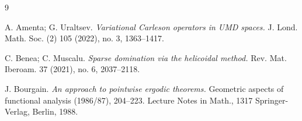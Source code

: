 \documentclass[12pt]{amsart}
\numberwithin{equation}{section}
\theoremstyle{definition}
\begin{document}
\begin{thebibliography}{9}

A. Amenta; G. Uraltsev.
\emph{Variational Carleson operators in UMD spaces.}
J. Lond. Math. Soc. (2) 105 (2022), no. 3, 1363–1417.





C. Benea; C. Muscalu.
\emph{Sparse domination via the helicoidal method.}
Rev. Mat. Iberoam. 37 (2021), no. 6, 2037–2118.





J. Bourgain.
\emph{An approach to pointwise ergodic theorems.} Geometric aspects of functional analysis (1986/87), 204–223.
Lecture Notes in Math., 1317
Springer-Verlag, Berlin, 1988.





\end{thebibliography}
\end{document}
